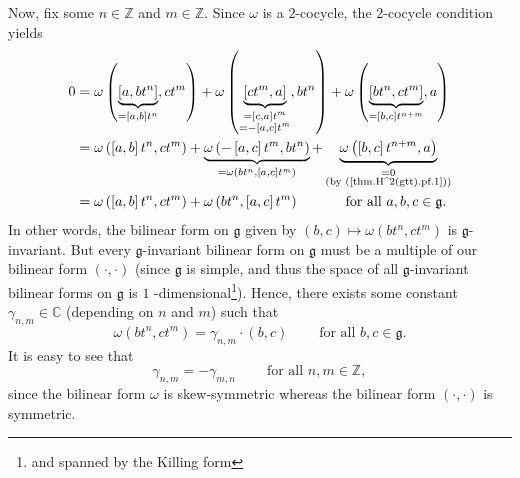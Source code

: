 \documentclass[etingof-lie.tex]{subfiles}
\begin{document}
Now, fix some $n\in\mathbb{Z}$ and $m\in\mathbb{Z}$. Since $\omega$ is a
$2$-cocycle, the $2$-cocycle condition yields%
\begin{align*}
0  &  =\omega\left(  \underbrace{\left[  a,bt^{n}\right]  }_{=\left[
a,b\right]  t^{n}},ct^{m}\right)  +\omega\left(  \underbrace{\left[
ct^{m},a\right]  }_{\substack{=\left[  c,a\right]  t^{m}\\=-\left[
a,c\right]  t^{m}}},bt^{n}\right)  +\omega\left(  \underbrace{\left[
bt^{n},ct^{m}\right]  }_{=\left[  b,c\right]  t^{n+m}},a\right) \\
&  =\omega\left(  \left[  a,b\right]  t^{n},ct^{m}\right)  +\underbrace{\omega
\left(  -\left[  a,c\right]  t^{m},bt^{n}\right)  }_{=\omega\left(
bt^{n},\left[  a,c\right]  t^{m}\right)  }+\underbrace{\omega\left(  \left[
b,c\right]  t^{n+m},a\right)  }_{\substack{=0\\\text{(by
(\ref{thm.H^2(gtt).pf.1}))}}}\\
&  =\omega\left(  \left[  a,b\right]  t^{n},ct^{m}\right)  +\omega\left(
bt^{n},\left[  a,c\right]  t^{m}\right)  \ \ \ \ \ \ \ \ \ \ \text{for all
}a,b,c\in\mathfrak{g}\text{.}%
\end{align*}
In other words, the bilinear form on $\mathfrak{g}$ given by $\left(
b,c\right)  \mapsto\omega\left(  bt^{n},ct^{m}\right)  $ is $\mathfrak{g}%
$-invariant. But every $\mathfrak{g}$-invariant bilinear form on
$\mathfrak{g}$ must be a multiple of our bilinear form $\left(  \cdot
,\cdot\right)  $ (since $\mathfrak{g}$ is simple, and thus the space of all
$\mathfrak{g}$-invariant bilinear forms on $\mathfrak{g}$ is $1$%
-dimensional\footnote{and spanned by the Killing form}). Hence, there exists
some constant $\gamma_{n,m}\in\mathbb{C}$ (depending on $n$ and $m$) such
that
\begin{equation}
\omega\left(  bt^{n},ct^{m}\right)  =\gamma_{n,m}\cdot\left(  b,c\right)
\ \ \ \ \ \ \ \ \ \ \text{for all }b,c\in\mathfrak{g}.
\label{thm.H^2(gtt).pf.2}%
\end{equation}
It is easy to see that%
\begin{equation}
\gamma_{n,m}=-\gamma_{m,n}\ \ \ \ \ \ \ \ \ \ \text{for all }n,m\in\mathbb{Z},
\label{thm.H^2(gtt).pf.3}%
\end{equation}
since the bilinear form $\omega$ is skew-symmetric whereas the bilinear form
$\left(  \cdot,\cdot\right)  $ is symmetric.
\end{document}
